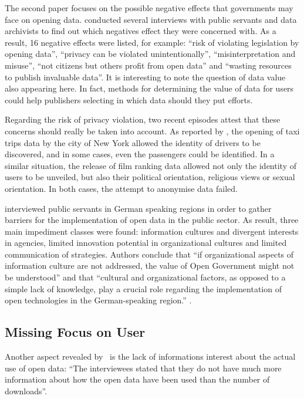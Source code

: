 The second paper focuses on the possible negative effects that governments may face on opening data.  conducted several interviews with public servants and data archivists to find out which negatives effect they were concerned with.
As a result, 16 negative effects were listed, for example: ``risk of violating legislation by opening data'', ``privacy can be violated unintentionally'', ``misinterpretation and misuse'', ``not citizens but others profit from open data'' and ``wasting resources to publish invaluable data''.
It is interesting to note the question of data value also appearing here.
In fact, methods for determining the value of data for users could help publishers selecting in which data should they put efforts.

Regarding the risk of privacy violation, two recent episodes attest that these concerns should really be taken into account.
As reported by , the opening of taxi trips data by the city of New York allowed the identity of drivers to be discovered, and in some cases, even the passengers could be identified.
In a similar situation, the release of film ranking data allowed not only the identity of users to be unveiled, but also their political orientation, religious views or sexual orientation.
In both cases, the attempt to anonymise data failed.

 interviewed public servants in German speaking regions in order to gather barriers for the implementation of open data in the public sector.
As result, three main impediment classes were found: information cultures and divergent interests in agencies, limited innovation potential in organizational cultures and limited communication of strategies.
Authors conclude that ``if organizational aspects of information culture are not addressed, the value of Open Government might not be understood'' and that ``cultural and organizational factors, as opposed to a simple lack of knowledge, play a crucial role regarding the implementation of open technologies in the German-speaking region.'' \cite[p.7]{Parycek2016}.

\subsection{Missing Focus on User}

Another aspect revealed by~ is the lack of informations interest about the actual use of open data: ``The interviewees stated that they do not have much more information about how the open data have been used than the number of downloads''.

